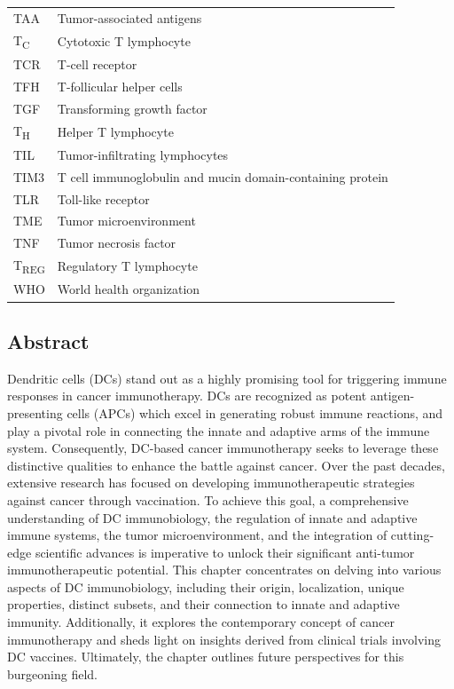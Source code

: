 \documentclass[
]{article}
\begin{document}
\begin{longtable}[]{@{}
  >{\raggedright\arraybackslash}p{}
  >{\raggedright\arraybackslash}p{}@{}}
TAA & Tumor-associated antigens \\
T\textsubscript{C} & Cytotoxic T lymphocyte \\
TCR & T-cell receptor \\
TFH & T-follicular helper cells \\
TGF & Transforming growth factor \\
T\textsubscript{H} & Helper T lymphocyte \\
TIL & Tumor-infiltrating lymphocytes \\
TIM3 & T cell immunoglobulin and mucin domain-containing protein \\
TLR & Toll-like receptor \\
TME & Tumor microenvironment \\
TNF & Tumor necrosis factor \\
T\textsubscript{REG} & Regulatory T lymphocyte \\
WHO & World health organization \\
\end{longtable}

\subsection{Abstract}\label{abstract}

Dendritic cells (DCs) stand out as a highly promising tool for
triggering immune responses in cancer immunotherapy. DCs are recognized
as potent antigen-presenting cells (APCs) which excel in generating
robust immune reactions, and play a pivotal role in connecting the
innate and adaptive arms of the immune system. Consequently, DC-based
cancer immunotherapy seeks to leverage these distinctive qualities to
enhance the battle against cancer. Over the past decades, extensive
research has focused on developing immunotherapeutic strategies against
cancer through vaccination. To achieve this goal, a comprehensive
understanding of DC immunobiology, the regulation of innate and adaptive
immune systems, the tumor microenvironment, and the integration of
cutting-edge scientific advances is imperative to unlock their
significant anti-tumor immunotherapeutic potential. This chapter
concentrates on delving into various aspects of DC immunobiology,
including their origin, localization, unique properties, distinct
subsets, and their connection to innate and adaptive immunity.
Additionally, it explores the contemporary concept of cancer
immunotherapy and sheds light on insights derived from clinical trials
involving DC vaccines. Ultimately, the chapter outlines future
perspectives for this burgeoning field.
\end{document}
